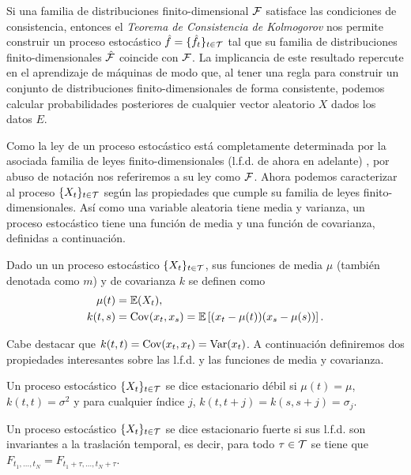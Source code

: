 Si una familia de distribuciones finito-dimensional \(\mathcal{F}\) satisface las condiciones de consistencia, entonces el \emph{Teorema de Consistencia de Kolmogorov} \cite{tao2011introduction} nos permite construir un proceso estocástico \(\hat{f} = \{\hat{f}_t\}_{t \in \mathcal{T}}\) tal que su familia de distribuciones finito-dimensionales \(\hat{\mathcal{F}}\) coincide con \(\mathcal{F}\). La implicancia de este resultado repercute en el aprendizaje de máquinas de modo que, al tener una regla para construir un conjunto de distribuciones finito-dimensionales de forma consistente, podemos calcular probabilidades posteriores de cualquier vector aleatorio \(X\) dados los datos \(E\).

Como la ley de un proceso estocástico está completamente determinada por la asociada familia de leyes finito-dimensionales (l.f.d. de ahora en adelante) \cite{ross1996stochastic}, por abuso de notación nos referiremos a su ley como \(\mathcal{F}\). Ahora podemos caracterizar al proceso \(\{X_t\}_{t \in \mathcal{T}}\) según las propiedades que cumple su familia de leyes finito-dimensionales. Así como una variable aleatoria tiene media y varianza, un proceso estocástico tiene una función de media y una función de covarianza, definidas a continuación.

\begin{definition}
	Dado un un proceso estocástico \(\{X_t\}_{t \in \mathcal{T}}\), sus funciones de media \(\mu\) (también denotada como \(m\)) y de covarianza \(k\) se definen como
	\begin{align*}
		\mu(t)	&= \mathbb{E}(X_t), \\
		k(t, s)	&= \operatorname{Cov}(x_t, x_s) = \mathbb{E}\left[(x_t - \mu(t)) (x_s - \mu(s))\right].
	\end{align*}
\end{definition}

Cabe destacar que \(k(t, t) = \operatorname{Cov}(x_t, x_t) = \operatorname{Var}(x_t)\). A continuación definiremos dos propiedades interesantes sobre las l.f.d. y las funciones de media y covarianza.

\begin{definition}
	Un proceso estocástico \(\{X_t\}_{t \in \mathcal{T}}\) se dice estacionario débil si \(\mu(t) = \mu\), \(k(t, t) = \sigma^2\) y para cualquier índice \(j\), \(k(t, t + j) = k(s, s + j) = \sigma_j\).
\end{definition}

\begin{definition}
	Un proceso estocástico \(\{X_t\}_{t \in \mathcal{T}}\) se dice estacionario fuerte si sus l.f.d. son invariantes a la traslación temporal, es decir, para todo \(\tau \in \mathcal{T}\) se tiene que \(F_{t_1, \dotsc, t_N} = F_{t_1 + \tau, \dotsc, t_N + \tau}\).
\end{definition}

